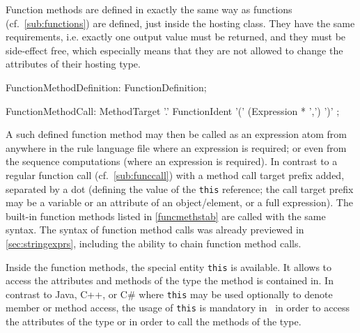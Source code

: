 Function methods are defined in exactly the same way as functions (cf.~\ref{sub:functions}) are defined, just inside the hosting class.
They have the same requirements, 
i.e. exactly one output value must be returned, 
and they must be side-effect free, which especially means that they are not allowed to change the attributes of their hosting type.

\begin{rail} 
  FunctionMethodDefinition: FunctionDefinition;
\end{rail}

\begin{rail}
  FunctionMethodCall: MethodTarget '.' FunctionIdent '(' (Expression * ',') ')' ;
\end{rail}

A such defined function method may then be called as an expression atom from anywhere in the rule language file where an expression is required; or even from the sequence computations (where an expression is required).
In contrast to a regular function call (cf.~\ref{sub:funccall}) with a method call target prefix added, separated by a dot (defining the value of the \texttt{this} reference; the call target prefix may be a variable or an attribute of an object/element, or a full expression).
The built-in function methods listed in \ref{funcmethstab} are called with the same syntax.
The syntax of function method calls was already previewed in \ref{sec:stringexprs}, including the ability to chain function method calls.

Inside the function methods, the special entity \texttt{this} is available.
It allows to access the attributes and methods of the type the method is contained in.
In contrast to Java, C++, or C\# where \texttt{this} may be used optionally to denote member or method access,
the usage of \texttt{this} is mandatory in \GrG~in order to access the attributes of the type or in order to call the methods of the type.

